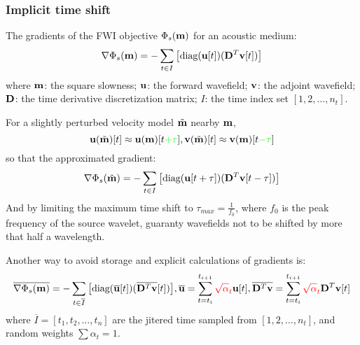\subsubsection{Implicit time shift}
The gradients of the FWI objective $\Phi_s(\mathbf{m})$ for an acoustic medium:
\[ \nabla\Phi_s(\mathbf{m})=-\sum_{t\in I}\big[\text{diag}(\mathbf{u}[t])(\mathbf{D}^T\mathbf{v}[t])\big] \]
where $\mathbf{m}$: the square slowness; $\mathbf{u}$: the forward wavefield; $\mathbf{v}$: the adjoint wavefield; $\mathbf{D}$: the time derivative discretization matrix; $I$: the time index set $[1,2,\ldots,n_t]$.\par
For a slightly perturbed velocity model $\tilde{\mathbf{m}}$ nearby $\mathbf{m}$,
\[ \mathbf{u}(\tilde{\mathbf{m}})[t]\approx\mathbf{u}(\mathbf{m})[t{\color{green}+\tau}],\mathbf{v}(\tilde{\mathbf{m}})[t]\approx\mathbf{v}(\mathbf{m})[t{\color{green}-\tau}] \]
so that the approximated gradient:
\[ \nabla\Phi_s(\tilde{\mathbf{m}})=-\sum_{t\in I}\big[\text{diag}(\mathbf{u}[t+\tau])(\mathbf{D}^T\mathbf{v}[t-\tau])\big] \]
And by limiting the maximum time shift to $\tau_{max}=\frac{1}{f_0}$, where $f_0$ is the peak frequency of the source wavelet, guaranty wavefields not to be shifted by more that half a wavelength.\par
Another way to avoid storage and explicit calculations of gradients is:
\[ \overline{\nabla\Phi_s(\mathbf{m})}=-\sum_{t\in\overline I}\big[\text{diag}(\overline{\mathbf{u}}[t])(\overline{\mathbf{D}^T\mathbf{v}}[t])\big],\overline{\mathbf{u}}=\sum_{t=t_i}^{t_{i+1}}{\color{red}\sqrt\alpha_t}\mathbf{u}[t], \overline{\mathbf{D}^T\mathbf{v}}=\sum_{t=t_i}^{t_{i+1}}{\color{red}\sqrt\alpha_t}\mathbf{D}^T\mathbf{v}[t] \]
where $\overline I=[t_1,t_2,\ldots,t_n]$ are the jitered time sampled from $[1,2,\ldots,n_t]$, and random weights $\sum\alpha_t=1$.\par
